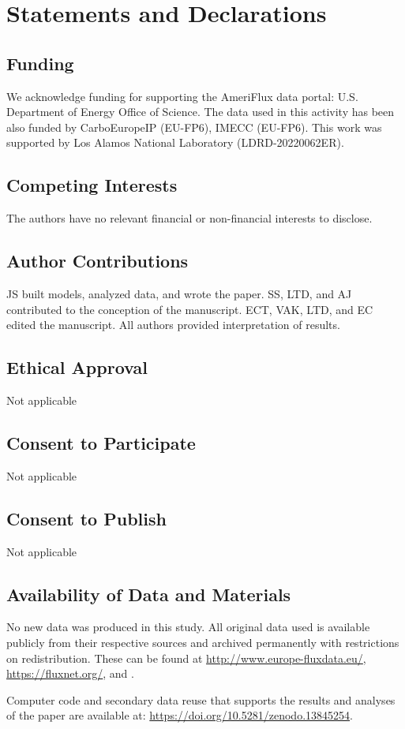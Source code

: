 \documentclass{article}
\begin{document}
\section*{Statements and Declarations}

\subsection*{Funding}

We acknowledge funding for supporting the AmeriFlux data portal: U.S. Department of Energy Office of Science. The data used in this activity has been also funded by CarboEuropeIP (EU-FP6), IMECC (EU-FP6). This work was supported by Los Alamos National Laboratory (LDRD-20220062ER).

\subsection*{Competing Interests}

The authors have no relevant financial or non-financial interests to disclose.

\subsection*{Author Contributions}

JS built models, analyzed data, and wrote the paper. SS, LTD, and AJ contributed to the conception of the manuscript. ECT, VAK, LTD, and EC edited the manuscript. All authors provided interpretation of results.

\subsection*{Ethical Approval}

Not applicable

\subsection*{Consent to Participate}

Not applicable

\subsection*{Consent to Publish}

Not applicable

\subsection*{Availability of Data and Materials}

No new data was produced in this study. All original data used is available publicly from their respective sources and archived permanently with restrictions on redistribution. These can be found at \url{http://www.europe-fluxdata.eu/}, \url{https://fluxnet.org/}, and \citep{cleverly2011alice}.

Computer code and secondary data reuse that supports the results and analyses of the paper are available at: \href{https://doi.org/10.5281/zenodo.13845254}{https://doi.org/10.5281/zenodo.13845254}.
\end{document}
